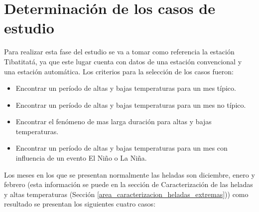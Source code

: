 


\section{Determinación de los casos de estudio}%


Para realizar esta fase del estudio se va a tomar como referencia la estación Tibatitatá, ya que este lugar cuenta con datos de una estación convencional y una estación automática. Los criterios para la selección de los casos fueron:

\begin{itemize}
    \item Encontrar un período de altas y bajas temperaturas para un mes típico.
    
    \item Encontrar un período de altas y bajas temperaturas para un mes no típico.
    
    \item Encontrar el fenómeno de mas larga duración para altas y bajas temperaturas.
    
    \item Encontrar un período de altas y bajas temperaturas para un mes con influencia de un evento El Niño o La Niña.
\end{itemize}

Los meses en los que se presentan normalmente las heladas son diciembre, enero y febrero (esta información se puede en la sección de Caracterización de las heladas y altas temperaturas (Sección \ref{area_caracterizacion_heladas_extremas})) como resultado se presentan los siguientes cuatro casos:



